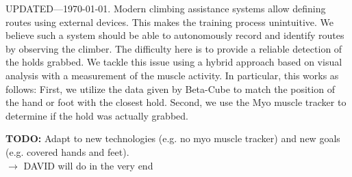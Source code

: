 UPDATED---\today.
Modern climbing assistance systems allow defining routes using external devices.
This makes the training process unintuitive.
We believe such a system should be able to autonomously record and identify routes by observing the climber.
The difficulty here is to provide a reliable detection of the holds grabbed.
We tackle this issue using a hybrid approach based on visual analysis with a measurement of the muscle activity.
In particular, this works as follows:
First, we utilize the data given by Beta-Cube to match the position of the hand or foot with the closest hold.
Second, we use the Myo muscle tracker to determine if the hold was actually grabbed.
  
\textbf{TODO:} Adapt to new technologies (e.g. no myo muscle tracker) and new goals (e.g. covered hands and feet). \\
$\rightarrow$ DAVID will do in the very end